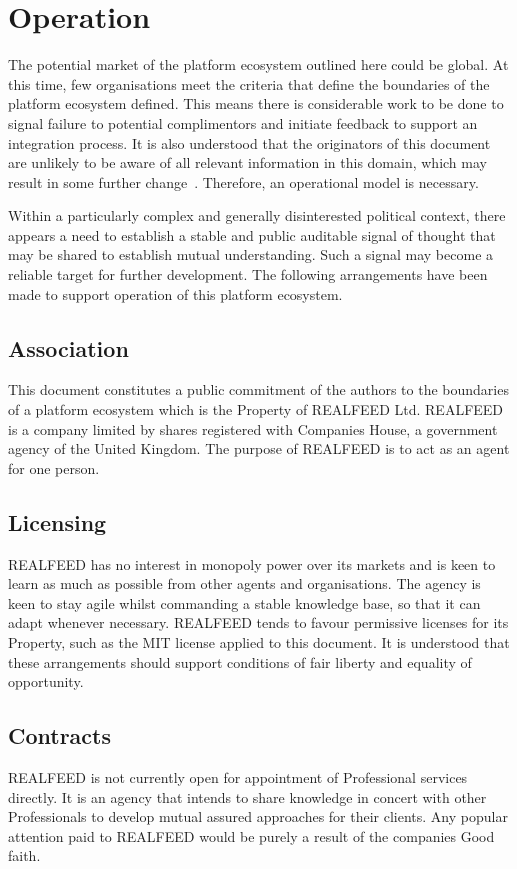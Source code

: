 \documentclass[11pt, oneside]{article}   	%
\begin{document}
\pagebreak

\section{Operation}
The potential market of the platform ecosystem outlined here could be global.
At this time, few organisations meet the criteria that define the boundaries of the platform ecosystem defined.
This means there is considerable work to be done to signal failure to potential complimentors and initiate feedback to support an integration process.
It is also understood that the originators of this document are unlikely to be aware of all relevant information in this domain, which may result in some further change~\cite{ont1}.
Therefore, an operational model is necessary.\

Within a particularly complex and generally disinterested political context, there appears a need to establish a stable and public auditable signal of thought that may be shared to establish mutual understanding.
Such a signal may become a reliable target for further development.
The following arrangements have been made to support operation of this platform ecosystem.\

\subsection{Association}
This document constitutes a public commitment of the authors to the boundaries of a platform ecosystem which is the Property of REALFEED Ltd.
REALFEED is a company limited by shares registered with Companies House, a government agency of the United Kingdom.
The purpose of REALFEED is to act as an agent for one person.

\subsection{Licensing}
REALFEED has no interest in monopoly power over its markets and is keen to learn as much as possible from other agents and organisations.
The agency is keen to stay agile whilst commanding a stable knowledge base, so that it can adapt whenever necessary.
REALFEED tends to favour permissive licenses for its Property, such as the MIT license applied to this document.
It is understood that these arrangements should support conditions of fair liberty and equality of opportunity. 

\subsection{Contracts}
REALFEED is not currently open for appointment of Professional services directly.
It is an agency that intends to share knowledge in concert with other Professionals to develop mutual assured approaches for their clients.
Any popular attention paid to REALFEED would be purely a result of the companies Good faith.
\end{document}

